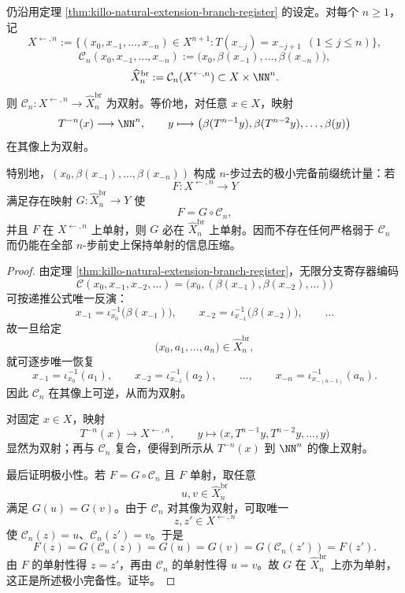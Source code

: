 \begin{theorem}\label{thm:xi-branch-register-finite-past-minimal-complete-prefix}
仍沿用定理 \ref{thm:killo-natural-extension-branch-register} 的设定。对每个 \(n\ge 1\)，记
\[
X^{\leftarrow,n}
:=
\{(x_0,x_{-1},\dots,x_{-n})\in X^{n+1}:T(x_{-j})=x_{-j+1}\ \ (1\le j\le n)\},
\]
\[
\mathcal C_n(x_0,x_{-1},\dots,x_{-n})
:=
\bigl(x_0,\beta(x_{-1}),\dots,\beta(x_{-n})\bigr),
\]
\[
\widehat X_n^{\mathrm{br}}
:=
\mathcal C_n(X^{\leftarrow,n})\subset X\times \NN^n.
\]
则 \(\mathcal C_n:X^{\leftarrow,n}\to \widehat X_n^{\mathrm{br}}\) 为双射。等价地，对任意 \(x\in X\)，映射
\[
T^{-n}(x)\longrightarrow \NN^n,
\qquad
y\longmapsto \bigl(\beta(T^{n-1}y),\beta(T^{n-2}y),\dots,\beta(y)\bigr)
\]
在其像上为双射。

特别地，\((x_0,\beta(x_{-1}),\dots,\beta(x_{-n}))\) 构成 \(n\)-步过去的极小完备前缀统计量：若
\[
F:X^{\leftarrow,n}\to Y
\]
满足存在映射 \(G:\widehat X_n^{\mathrm{br}}\to Y\) 使
\[
F=G\circ \mathcal C_n,
\]
并且 \(F\) 在 \(X^{\leftarrow,n}\) 上单射，则 \(G\) 必在 \(\widehat X_n^{\mathrm{br}}\) 上单射。因而不存在任何严格弱于 \(\mathcal C_n\) 而仍能在全部 \(n\)-步前史上保持单射的信息压缩。
\end{theorem}
\begin{proof}
由定理 \ref{thm:killo-natural-extension-branch-register}，无限分支寄存器编码
\[
\mathcal C(x_0,x_{-1},x_{-2},\dots)=\bigl(x_0,(\beta(x_{-1}),\beta(x_{-2}),\dots)\bigr)
\]
可按递推公式唯一反演：
\[
x_{-1}=\iota_{x_0}^{-1}\!\bigl(\beta(x_{-1})\bigr),\qquad
x_{-2}=\iota_{x_{-1}}^{-1}\!\bigl(\beta(x_{-2})\bigr),\qquad \dots
\]
故一旦给定
\[
\bigl(x_0,a_1,\dots,a_n\bigr)\in \widehat X_n^{\mathrm{br}},
\]
就可逐步唯一恢复
\[
x_{-1}=\iota_{x_0}^{-1}(a_1),\qquad
x_{-2}=\iota_{x_{-1}}^{-1}(a_2),\qquad \dots,\qquad
x_{-n}=\iota_{x_{-(n-1)}}^{-1}(a_n).
\]
因此 \(\mathcal C_n\) 在其像上可逆，从而为双射。

对固定 \(x\in X\)，映射
\[
T^{-n}(x)\longrightarrow X^{\leftarrow,n},
\qquad
y\longmapsto \bigl(x,T^{n-1}y,T^{n-2}y,\dots,y\bigr)
\]
显然为双射；再与 \(\mathcal C_n\) 复合，便得到所示从 \(T^{-n}(x)\) 到 \(\NN^n\) 的像上双射。

最后证明极小性。若 \(F=G\circ \mathcal C_n\) 且 \(F\) 单射，取任意
\[
u,v\in \widehat X_n^{\mathrm{br}}
\]
满足 \(G(u)=G(v)\)。由于 \(\mathcal C_n\) 对其像为双射，可取唯一
\[
z,z'\in X^{\leftarrow,n}
\]
使 \(\mathcal C_n(z)=u\)、\(\mathcal C_n(z')=v\)。于是
\[
F(z)=G(\mathcal C_n(z))=G(u)=G(v)=G(\mathcal C_n(z'))=F(z').
\]
由 \(F\) 的单射性得 \(z=z'\)，再由 \(\mathcal C_n\) 的单射性得 \(u=v\)。故 \(G\) 在 \(\widehat X_n^{\mathrm{br}}\) 上亦为单射，这正是所述极小完备性。证毕。
\end{proof}


